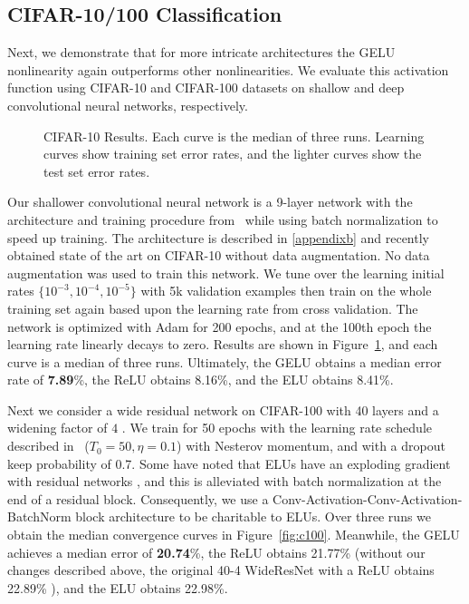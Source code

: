 \documentclass{article}
\begin{document}
\subsection{CIFAR-10/100 Classification}
Next, we demonstrate that for more intricate architectures the GELU nonlinearity again outperforms other nonlinearities. We evaluate this activation function using CIFAR-10 and CIFAR-100 datasets \citep{cifar} on shallow and deep convolutional neural networks, respectively.

\begin{figure}
	\vspace{-5pt}
	\centering
	\noindent\makebox[\textwidth]{\texttt{[image: c10]}}
	\caption{CIFAR-10 Results. Each curve is the median of three runs. Learning curves show training set error rates, and the lighter curves show the test set error rates.}\label{fig:c10}
	\vspace{-5pt}
\end{figure}

Our shallower convolutional neural network is a 9-layer network with the architecture and training procedure from~\cite{weightnorm} while using batch normalization to speed up training. The architecture is described in \cref{appendixb} and recently obtained state of the art on CIFAR-10 without data augmentation. No data augmentation was used to train this network. We tune over the learning initial rates $\{10^{-3},10^{-4},10^{-5}\}$ with 5k validation examples then train on the whole training set again based upon the learning rate from cross validation. The network is optimized with Adam for 200 epochs, and at the 100th epoch the learning rate linearly decays to zero. Results are shown in Figure~\ref{fig:c10}, and each curve is a median of three runs. Ultimately, the GELU obtains a median error rate of \textbf{7.89}\%, the ReLU obtains 8.16\%, and the ELU obtains 8.41\%.

Next we consider a wide residual network on CIFAR-100 with 40 layers and a widening factor of $4$ \citep{wrn}. We train for 50 epochs with the learning rate schedule described in~\citep{SGDR} ($T_0=50, \eta=0.1$) with Nesterov momentum, and with a dropout keep probability of 0.7. Some have noted that ELUs have an exploding gradient with residual networks \citep{eluresnet}, and this is alleviated with batch normalization at the end of a residual block. Consequently, we use a Conv-Activation-Conv-Activation-BatchNorm block architecture to be charitable to ELUs. Over three runs we obtain the median convergence curves in Figure~\ref{fig:c100}. Meanwhile, the GELU achieves a median error of \textbf{20.74}\%, the ReLU obtains 21.77\% (without our changes described above, the original 40-4 WideResNet with a ReLU obtains 22.89\% \citep{wrn}), and the ELU obtains 22.98\%.
\end{document}
